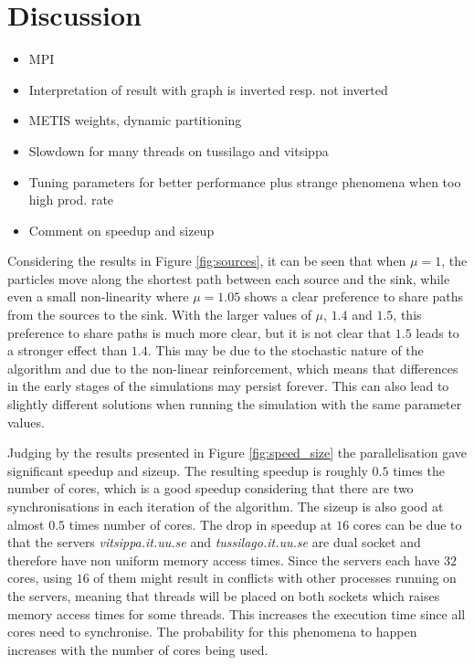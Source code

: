 \section{Discussion}
\label{sec:discussion}

\begin{itemize}
\item MPI
\item Interpretation of result with graph is inverted resp. not inverted
\item METIS weights, dynamic partitioning
\item Slowdown for many threads on tussilago and vitsippa
\item Tuning parameters for better performance plus strange phenomena when too high prod. rate
\item Comment on speedup and sizeup
\end{itemize}

Considering the results in Figure \ref{fig:sources}, it can be seen that when $\mu = 1$, the particles move along the shortest path between each source and the sink, while even a small non-linearity where $\mu = 1.05$ shows a clear preference to share paths from the sources to the sink. With the larger values of $\mu$, $1.4$ and $1.5$, this preference to share paths is much more clear, but it is not clear that $1.5$ leads to a stronger effect than $1.4$. This may be due to the stochastic nature of the algorithm and due to the non-linear reinforcement, which means that differences in the early stages of the simulations may persist forever. This can also lead to slightly different solutions when running the simulation with the same parameter values.


Judging by the results presented in Figure \ref{fig:speed_size} the parallelisation gave significant speedup and sizeup. The resulting speedup is roughly $0.5$ times the number of cores, which is a good speedup considering that there are two synchronisations in each iteration of the algorithm. The sizeup is also good at almost $0.5$ times number of cores. The drop in speedup at $16$ cores can be due to that the servers \textit{vitsippa.it.uu.se} and \textit{tussilago.it.uu.se} are dual socket and therefore have non uniform memory access times. Since the servers each have $32$ cores, using $16$ of them might result in conflicts with other processes running on the servers, meaning that threads will be placed on both sockets which raises memory access times for some threads. This increases the execution time since all cores need to synchronise. The probability for this phenomena to happen increases with the number of cores being used.

